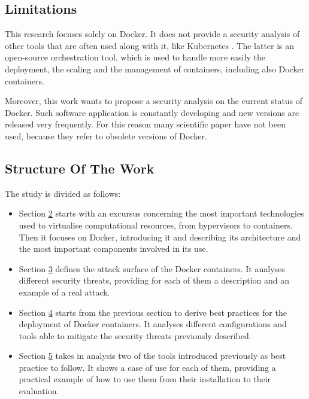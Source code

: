 \documentclass[a4paper,12pt]{article}
\begin{document}
\subsection{Limitations}

This research focuses solely on Docker. It does not provide a security analysis
of other tools that are often used along with it, like Kubernetes
\cite{kubernetes}. The latter is an open-source orchestration tool, which is
used to handle more easily the deployment, the scaling and the management of
containers, including also Docker containers. \par Moreover, this work wants to
propose a security analysis on the current status of Docker. Such software
application is constantly developing and new versions are released very
frequently. For this reason many scientific paper have not been used, because
they refer to obsolete versions of Docker.

\subsection{Structure Of The Work}

The study is divided as follows:
\begin{itemize}
  \item Section \hyperref[sec:docker_overview]{2} starts with an excursus
  concerning the most important technologies used to virtualise computational
  resources, from hypervisors to containers. Then it focuses on Docker,
  introducing it and describing its architecture and the most important
  components involved in its use. 
  \item Section \hyperref[sec:docker_security_threats]{3} defines the
  attack surface of the Docker containers. It analyses different security
  threats, providing for each of them a description and an example of a real
  attack. 
  \item Section \hyperref[sec:best_practices_for_docker_deployment]{4} starts
  from the previous section to derive best practices for the deployment of
  Docker containers. It analyses different configurations and tools able to
  mitigate the security threats previously described.
  \item Section \hyperref[sec:practical_evaluation]{5} takes in analysis two of
  the tools introduced previously as best practice to follow. It shows a case of
  use for each of them, providing a practical example of how to use them from
  their installation to their evaluation.
\end{itemize}
\end{document}
